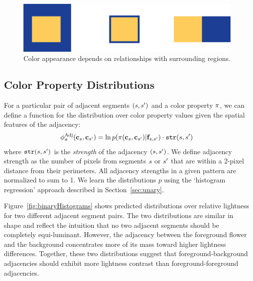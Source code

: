 \begin{figure}[ht]
\centering
\includegraphics[width=.7\columnwidth]{figs/surround}
\caption{Color appearance depends on relationships with surrounding regions.}
\label{fig:surround}
\end{figure}

\subsection{Color Property Distributions}
\label{sec:binaryDistribs}

For a particular pair of adjacent segments $(s, {s^{\prime}})$ and a color property $\pi$, we can define a function for the distribution over color property values given the spatial features of the adjacency:
\begin{equation*}
\phi^{\textrm{Adj}}_\pi(\mathbf{c}_s, \mathbf{c}_{s^{\prime}}) = \ln p( \pi( \mathbf{c}_s, \mathbf{c}_{s^{\prime}} ) | \mathbf{f}_{s, {s^{\prime}}} ) \cdot \texttt{str}(s, {s^{\prime}})
\end{equation*}
where $\texttt{str}(s,{s^{\prime}})$ is the \emph{strength} of the adjacency $(s,{s^{\prime}})$. We define adjacency strength as the number of pixels from segments $s$ or ${s^{\prime}}$ that are within a 2-pixel distance from their perimeters. All adjacency strengths in a given pattern are normalized to sum to 1. We learn the distributions $p$ using the `histogram regression' approach described in Section~\ref{sec:unary}.

Figure~\ref{fig:binaryHistograms} shows predicted distributions over relative lightness for two different adjacent segment pairs. The two distributions are similar in shape and reflect the intuition that no two adjacent segments should be completely equi-luminant. However, the adjacency between the foreground flower and the background concentrates more of its mass toward higher lightness differences. Together, these two distributions suggest that foreground-background adjacencies should exhibit more lightness contrast than foreground-foreground adjacencies.

